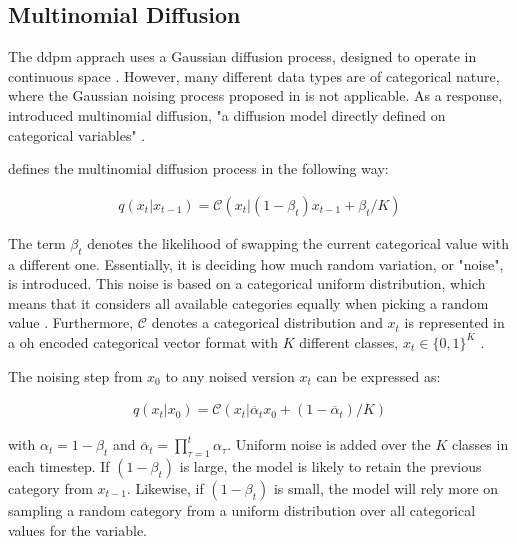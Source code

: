 \subsection{Multinomial Diffusion}
\label{ch:multinomial}
The \gls{ddpm} apprach uses a Gaussian diffusion process, designed to operate in continuous space \cite{kotelnikov2022TabDDPMModellingTabular}.
However, many different data types are of categorical nature, where the Gaussian noising process proposed in  is not applicable.
As a response, \textcite{hoogeboom2021ArgmaxFlowsMultinomial} introduced multinomial diffusion, "a diffusion model directly defined on categorical variables" \cite[p, 3]{hoogeboom2021ArgmaxFlowsMultinomial}.

\cite{hoogeboom2021ArgmaxFlowsMultinomial} defines the multinomial diffusion process in the following way:

\begin{equation}
  \begin{align*}
    \label{eqn:mul_diff1}
    q(x_{t}|x_{t-1}) = \mathcal{C}(x_t|(1-\beta_t)x_{t-1}+\beta_t/K)
  \end{align*}
\end{equation}


The term $\beta_t$ denotes the likelihood of swapping the current categorical value with a different one. 
Essentially, it is deciding how much random variation, or "noise", is introduced.
This noise is based on a categorical uniform distribution, which means that it considers all available categories equally when picking a random value \cite{hoogeboom2021ArgmaxFlowsMultinomial}.
Furthermore, $\mathcal{C}$ denotes a categorical distribution and $x_t$ is represented in a \gls{oh} encoded categorical vector format with $K$ different classes, $x_t\in\{0,1\}^K$ \cite{hoogeboom2021ArgmaxFlowsMultinomial}.

The noising step from $x_0$ to any noised version $x_t$ can be expressed as:

\begin{equation}
  \begin{align*}
    \label{eqn:mul_diff2}
    q(x_{t}|x_{0}) = \mathcal{C}(x_t|\overline{\alpha}_tx_{0}+(1-\overline{\alpha}_t)/K)
  \end{align*}
\end{equation}

with $\alpha_t = 1-\beta_t$ and $\overline{\alpha}_t = \prod_{\tau=1}^{t}\alpha_\tau$.
Uniform noise is added over the $K$ classes in each timestep.
If $(1-\beta_t)$ is large, the model is likely to retain the previous category from $x_{t-1}$. 
Likewise, if $(1-\beta_t)$ is small, the model will rely more on sampling a random category from a uniform distribution over all categorical values for the variable.

